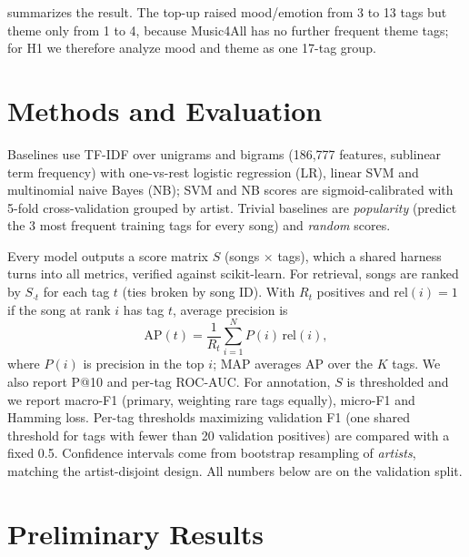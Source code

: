 \documentclass{article}
\begin{document}
 summarizes the result. The top-up raised mood/emotion from 3 to 13 tags but theme only from 1 to 4, because Music4All has no further frequent theme tags; for H1 we therefore analyze mood and theme as one 17-tag group.

\section{Methods and Evaluation}\label{sec:method}

Baselines use TF-IDF over unigrams and bigrams (186,777 features, sublinear term frequency) with one-vs-rest logistic regression (LR), linear SVM and multinomial naive Bayes (NB); SVM and NB scores are sigmoid-calibrated with 5-fold cross-validation grouped by artist. Trivial baselines are \emph{popularity} (predict the 3 most frequent training tags for every song) and \emph{random} scores.

Every model outputs a score matrix $S$ (songs $\times$ tags), which a shared harness turns into all metrics, verified against scikit-learn. For retrieval, songs are ranked by $S_{\cdot t}$ for each tag $t$ (ties broken by song ID). With $R_t$ positives and $\mathrm{rel}(i)=1$ if the song at rank $i$ has tag $t$, average precision is
\begin{equation}
\mathrm{AP}(t)=\frac{1}{R_t}\sum_{i=1}^{N} P(i)\,\mathrm{rel}(i),
\label{eq:ap}
\end{equation}
where $P(i)$ is precision in the top $i$; MAP averages AP over the $K$ tags. We also report P@10 and per-tag ROC-AUC. For annotation, $S$ is thresholded and we report macro-F1 (primary, weighting rare tags equally), micro-F1 and Hamming loss. Per-tag thresholds maximizing validation F1 (one shared threshold for tags with fewer than 20 validation positives) are compared with a fixed 0.5. Confidence intervals come from bootstrap resampling of \emph{artists}, matching the artist-disjoint design. All numbers below are on the validation split.

\section{Preliminary Results}\label{sec:results}
\end{document}
